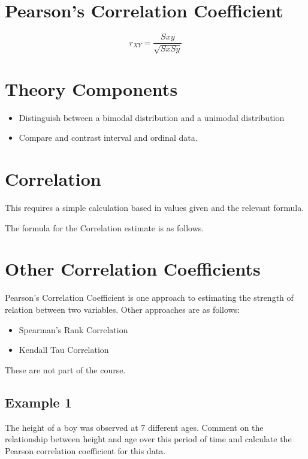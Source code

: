 
\section{Pearson's Correlation Coefficient}
\[ r_{XY} = \frac{Sxy}{\sqrt{SxSy}} \]








\section*{Theory Components}
\begin{itemize}
	\item Distinguish between a bimodal distribution and a unimodal distribution
	\item Compare and contrast interval and ordinal data.
\end{itemize}

\section{Correlation}

This requires a simple calculation based in values given and the relevant formula.

The formula for the Correlation estimate is as follows.







\section{Other Correlation Coefficients}
Pearson's Correlation Coefficient is one approach to estimating the strength of relation between two variables.
Other approaches are as follows:
\begin{itemize}
	\item Spearman's Rank Correlation
	\item Kendall Tau Correlation
\end{itemize}
These are not part of the course.


\subsection{Example 1}
The height of a boy was observed at 7 different ages.
Comment on the relationship between height and age over this
period of time and calculate the Pearson correlation coefficient for
this data.

